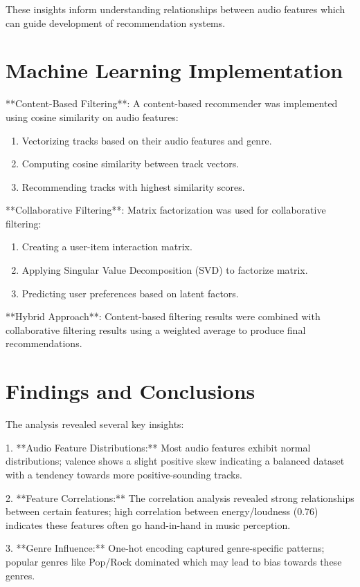 \documentclass[runningheads]{llncs}
\begin{document}
These insights inform understanding relationships between audio features which can guide development of recommendation systems.

\section{Machine Learning Implementation}

**Content-Based Filtering**: A content-based recommender was implemented using cosine similarity on audio features:
\begin{enumerate}
    \item Vectorizing tracks based on their audio features and genre.
    \item Computing cosine similarity between track vectors.
    \item Recommending tracks with highest similarity scores.
\end{enumerate}

**Collaborative Filtering**: Matrix factorization was used for collaborative filtering:
\begin{enumerate}
    \item Creating a user-item interaction matrix.
    \item Applying Singular Value Decomposition (SVD) to factorize matrix.
    \item Predicting user preferences based on latent factors.
\end{enumerate}

**Hybrid Approach**: Content-based filtering results were combined with collaborative filtering results using a weighted average to produce final recommendations.

\section{Findings and Conclusions}

The analysis revealed several key insights:

1. **Audio Feature Distributions:** Most audio features exhibit normal distributions; valence shows a slight positive skew indicating a balanced dataset with a tendency towards more positive-sounding tracks.
  
2. **Feature Correlations:** The correlation analysis revealed strong relationships between certain features; high correlation between energy/loudness (0.76) indicates these features often go hand-in-hand in music perception.
  
3. **Genre Influence:** One-hot encoding captured genre-specific patterns; popular genres like Pop/Rock dominated which may lead to bias towards these genres.
  
\end{document}
